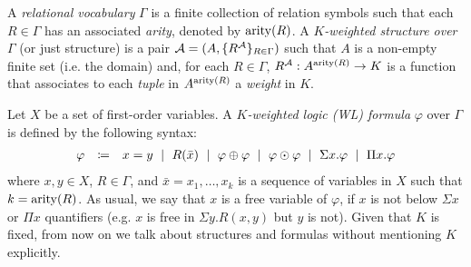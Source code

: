 A \textit{relational vocabulary} $\Gamma$ is a finite collection of relation symbols such that each $R \in \Gamma$ has an associated \textit{arity}, denoted by $\operatorname{arity}(R)$.
A \textit{$K$-weighted structure over $\Gamma$} (or just structure) is a pair $\mathcal{A} = (A, \{R^{\mathcal{A}}\}_{R \in \Gamma})$ such that $A$ is a non-empty finite set (i.e. the domain) and, for each $R \in \Gamma$, $R^{\mathcal{A}}: A^{\operatorname{arity}(R)} \rightarrow K$ is a function that associates to each \textit{tuple} in $A^{\operatorname{arity}(R)}$ a \textit{weight} in $K$.

Let $X$ be a set of first-order variables. A \textit{$K$-weighted logic (WL) formula} $\varphi$ over $\Gamma$ is defined by the following syntax:
$$
\begin{array}{rcl}
\varphi & \coloneqq  & x = y \ \mid \ R(\bar{x}) \ \mid \ \varphi \ksum \varphi \ \mid \ \varphi \kprod \varphi \ \mid \ \Sigma x. \varphi \ \mid \ \Pi x. \varphi
\end{array}
$$ 
where $x, y \in X$, $R \in \Gamma$, and $\bar{x} = x_1, \ldots, x_k$ is a sequence of variables in $X$ such that $k=\operatorname{arity}(R)$. As usual, we say that $x$ is a free variable of $\varphi$, if $x$ is not below $\Sigma x$ or $\Pi x$ quantifiers (e.g. $x$ is free in $\Sigma y. R(x,y)$ but $y$ is not). 
Given that $K$ is fixed, from now on we talk about structures and formulas without mentioning $K$ explicitly.  

